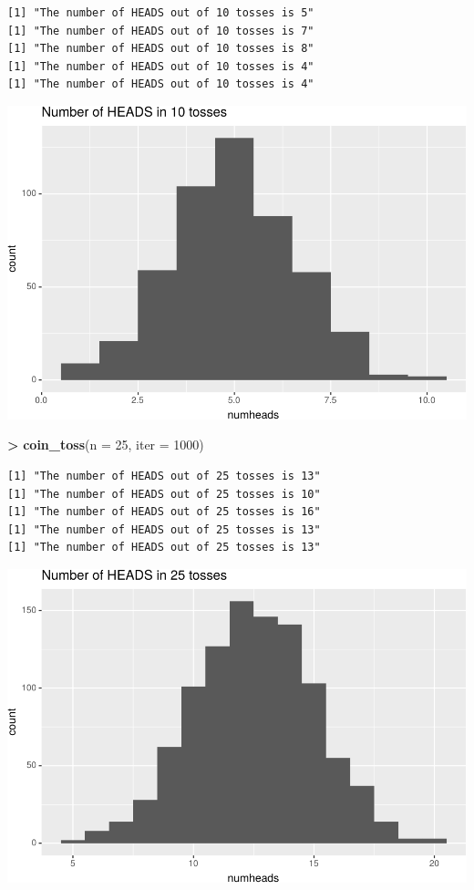\documentclass[]{krantz}
\makeatletter
\newenvironment{Shaded}{\begin{snugshade}}{\end{snugshade}}
\newcommand{\DataTypeTok}[1]{\textcolor[rgb]{0.27,0.27,0.27}{#1}}
\newcommand{\DecValTok}[1]{\textcolor[rgb]{0.06,0.06,0.06}{#1}}
\newcommand{\KeywordTok}[1]{\textcolor[rgb]{0.27,0.27,0.27}{\textbf{#1}}}
\newcommand{\NormalTok}[1]{#1}
\newcommand{\OperatorTok}[1]{\textcolor[rgb]{0.43,0.43,0.43}{\textbf{#1}}}
\newcommand{\StringTok}[1]{\textcolor[rgb]{0.5,0.5,0.5}{#1}}
\newenvironment{kframe}{%
\medskip{}
\setlength{\fboxsep}{.8em}
 \def\at@end@of@kframe{}%
 \ifinner\ifhmode%
  \def\at@end@of@kframe{\end{minipage}}%
  \begin{minipage}{\columnwidth}%
 \fi\fi%
 \def\FrameCommand##1{\hskip\@totalleftmargin \hskip-\fboxsep
 \colorbox{shadecolor}{##1}\hskip-\fboxsep
     \hskip-\linewidth \hskip-\@totalleftmargin \hskip\columnwidth}%
 \MakeFramed {\advance\hsize-\width
   \@totalleftmargin\z@ \linewidth\hsize
   \@setminipage}}%
 {\par\unskip\endMakeFramed%
 \at@end@of@kframe}
\renewenvironment{Shaded}{\begin{kframe}}{\end{kframe}}
\makeatother
\begin{document}
\begin{verbatim}
[1] "The number of HEADS out of 10 tosses is 5"
[1] "The number of HEADS out of 10 tosses is 7"
[1] "The number of HEADS out of 10 tosses is 8"
[1] "The number of HEADS out of 10 tosses is 4"
[1] "The number of HEADS out of 10 tosses is 4"
\end{verbatim}

\includegraphics{bookdown_files/figure-latex/cointoss-1.pdf}

\begin{Shaded}
\begin{Highlighting}[]
\OperatorTok{>}\StringTok{ }\KeywordTok{coin_toss}\NormalTok{(}\DataTypeTok{n =} \DecValTok{25}\NormalTok{, }\DataTypeTok{iter =} \DecValTok{1000}\NormalTok{)}
\end{Highlighting}
\end{Shaded}

\begin{verbatim}
[1] "The number of HEADS out of 25 tosses is 13"
[1] "The number of HEADS out of 25 tosses is 10"
[1] "The number of HEADS out of 25 tosses is 16"
[1] "The number of HEADS out of 25 tosses is 13"
[1] "The number of HEADS out of 25 tosses is 13"
\end{verbatim}

\includegraphics{bookdown_files/figure-latex/cointoss-2.pdf}
\end{document}
